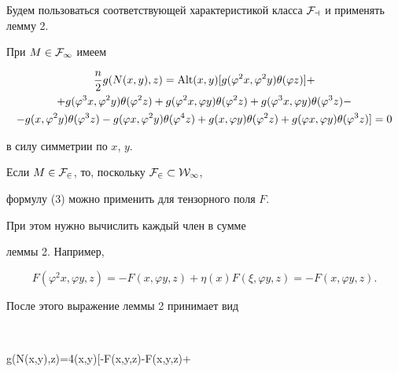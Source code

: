 \begin{pf} 


Будем пользоваться соответствующей характеристикой класса $\cal 


F_a$ и применять лемму 2. 


 


При $M\in\cal F_1$ имеем 


\begin{multline*} 


\frac{n}{2}g(N(x,y),z)=\Alt(x,y)[g(\varphi^2x,\varphi ^2y) 


\theta(\varphi z)]+ \\ 


% 


+g(\varphi ^3x,\varphi ^2y)\theta(\varphi ^2z)+ 


g(\varphi ^2x,\varphi y)\theta(\varphi ^2z)+ 


g(\varphi ^3x,\varphi y)\theta(\varphi ^3z)- \\ 


% 


-g(x,\varphi ^2y)\theta(\varphi ^3z)- 


g(\varphi x,\varphi ^2y)\theta(\varphi ^4z)+ 


g(x,\varphi y)\theta(\varphi ^2z)+ 


g(\varphi x,\varphi y)\theta(\varphi ^3z)]=0 


\end{multline*} 


в силу симметрии по $x$, $y$. 





 


Если $M\in\cal F_2$, то, поскольку $\cal F_2\subset W_1$,


формулу (3) можно применить для тензорного поля $F$.


При этом нужно вычислить каждый член в сумме 


леммы 2. Например, 


$$ 


F(\varphi ^2x,\varphi y,z)=-F(x,\varphi y,z)+\eta(x) 


F(\xi,\varphi y,z)=-F(x,\varphi y,z). 


$$ 


После этого выражение леммы 2 принимает вид


$$ 


g(N(x,y),z)=4\Alt(x,y)[-F(x,\varphi y,z)-F(x,y,\varphi z)+ 



\end{pf}
